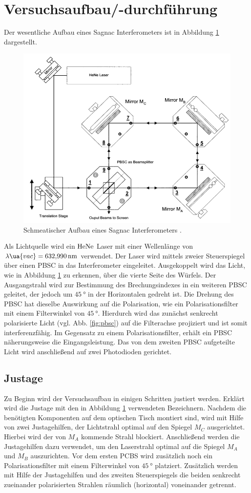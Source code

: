 \section{Versuchsaufbau/-durchführung}\label{sec: procedure}
Der wesentliche Aufbau eines Sagnac Interferometers ist in Abbildung \ref{fig:sagnac_interferometer}
dargestellt.
\begin{figure}
\centering
\includegraphics[width=0.6\linewidth]{./content/images/aufbau.png}
\caption{Schmeatischer Aufbau eines Sagnac Interferometers \cite{anleitung64}.}
\label{fig:sagnac_interferometer}
\end{figure}
Als Lichtquelle wird ein $\ce{HeNe}$ Laser mit einer Wellenlänge von
$\lambda\ua{vac}=\SI{632.990}{\nano\meter}$ verwendet. Der Laser wird mittels zweier Steuerspiegel
über einen PBSC in das Interferometer eingeleitet. Ausgekoppelt wird das Licht, wie
in Abbildung \ref{fig:sagnac_interferometer} zu erkennen, über die vierte Seite
des Würfels.
Der Ausgangstrahl wird zur Bestimmung des Brechungsindexes in ein weiteren
PBSC geleitet, der jedoch um $\SI{45}{\degree}$ in der Horizontalen gedreht ist.
Die Drehung des PBSC hat dieselbe Auswirkung auf die Polarisation, wie ein Polarisationsfilter mit
einem Filterwinkel von $\SI{45}{\degree}$. Hierdurch wird das zunächst senkrecht
polarisierte Licht (vgl. Abb. \ref{fig:pbsc}) auf die Filterachse projiziert und
ist somit interferenzfähig. Im Gegensatz zu einem Polarisationsfilter, erhält ein
PBSC näherungsweise die Eingangsleistung.
Das von dem zweiten PBSC aufgeteilte Licht wird
anschließend auf zwei Photodioden gerichtet.

\subsection{Justage}
Zu Beginn wird der Versuchsaufbau in einigen Schritten justiert werden.
Erklärt wird die Justage mit den in Abbildung \ref{fig:sagnac_interferometer} verwendeten Bezeichnern.
Nachdem die benötigten Komponenten auf dem optischen Tisch montiert sind,
wird mit Hilfe von zwei Justagehilfen, der Lichtstrahl optimal auf den Spiegel $M_C$
ausgerichtet. Hierbei wird der von $M_A$ kommende Strahl blockiert.
Anschließend werden die Justagehilfen dazu verwendet, um den Laserstrahl optimal auf
die Spiegel $M_A$ und $M_B$ auszurichten. Vor dem ersten PCBS wird zusätzlich noch ein Polarisationsfilter
mit einem Filterwinkel von $\SI{45}{\degree}$ platziert. Zusätzlich werden mit Hilfe der Justagehilfen
und des zweiten Steuerspiegels die beiden senkrecht zueinander polarisierten Strahlen räumlich (horizontal)
voneinander getrennt.


